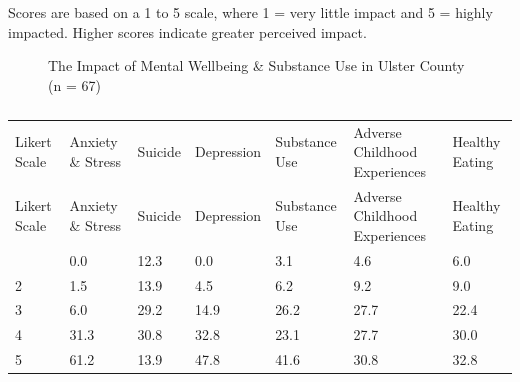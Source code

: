 \documentclass[
  english,
  letterpaper,
]{report}
\begin{document}
\begin{tcolorbox}[enhanced jigsaw, breakable, leftrule=.75mm, title=\textcolor{quarto-callout-note-color}{\faInfo}\hspace{0.5em}{Note}, bottomrule=.15mm, opacityback=0, left=2mm, colback=white, bottomtitle=1mm, coltitle=black, colbacktitle=quarto-callout-note-color!10!white, colframe=quarto-callout-note-color-frame, opacitybacktitle=0.6, toptitle=1mm, titlerule=0mm, arc=.35mm, rightrule=.15mm, toprule=.15mm]

Scores are based on a 1 to 5 scale, where 1 = very little impact and 5 =
highly impacted. Higher scores indicate greater perceived impact.

\end{tcolorbox}

\begin{figure}


\caption{\label{fig-uc-impact-mhsu}The Impact of Mental Wellbeing \&
Substance Use in Ulster County (n = 67)}

\end{figure}%

\begin{longtable}[]{@{}lllllll@{}}

\caption{\label{tbl-uc-impact-mhsu}The Impact of Mental Wellbeing \&
Substance Use in Ulster County (n = 67)}

\tabularnewline

\caption{}\label{T_3125d}\tabularnewline
\toprule\noalign{}
Likert Scale & Anxiety \& Stress & Suicide & Depression & Substance Use
& Adverse Childhood Experiences & Healthy Eating \\
\midrule\noalign{}
\endfirsthead
\toprule\noalign{}
Likert Scale & Anxiety \& Stress & Suicide & Depression & Substance Use
& Adverse Childhood Experiences & Healthy Eating \\
\midrule\noalign{}
\endhead
\bottomrule\noalign{}
\endlastfoot
1 & 0.0 & 12.3 & 0.0 & 3.1 & 4.6 & 6.0 \\
2 & 1.5 & 13.9 & 4.5 & 6.2 & 9.2 & 9.0 \\
3 & 6.0 & 29.2 & 14.9 & 26.2 & 27.7 & 22.4 \\
4 & 31.3 & 30.8 & 32.8 & 23.1 & 27.7 & 30.0 \\
5 & 61.2 & 13.9 & 47.8 & 41.6 & 30.8 & 32.8 \\

\end{longtable}
\end{document}
